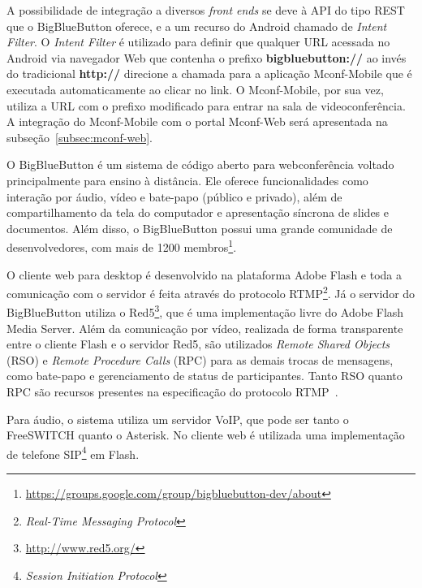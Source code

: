 \documentclass{acm_proc_article-sp}
\begin{document}
A possibilidade de integração a diversos \emph{front ends} se deve à API do tipo REST que o BigBlueButton oferece, e a um recurso do Android chamado de \emph{Intent Filter}. O \emph{Intent Filter} é utilizado para definir que qualquer URL acessada no Android via navegador Web que contenha o prefixo \textbf{bigbluebutton://} ao invés do tradicional \textbf{http://} direcione a chamada para a aplicação Mconf-Mobile que é executada automaticamente ao clicar no link. O Mconf-Mobile, por sua vez, utiliza a URL com o prefixo modificado para entrar na sala de videoconferência. A integração do Mconf-Mobile com o portal Mconf-Web será apresentada na subseção~\ref{subsec:mconf-web}.


O BigBlueButton é um sistema de código aberto para webconferência voltado principalmente para ensino à distância. Ele oferece funcionalidades como interação por áudio, vídeo e bate-papo (público e privado), além de compartilhamento da tela do computador e apresentação síncrona de slides e documentos. Além disso, o BigBlueButton possui uma grande comunidade de desenvolvedores, com mais de 1200 membros\footnote{\url{https://groups.google.com/group/bigbluebutton-dev/about}}.

O cliente web para desktop é desenvolvido na plataforma Adobe Flash e toda a comunicação com o servidor é feita através do protocolo RTMP\footnote{\emph{Real-Time Messaging Protocol}}. Já o servidor do BigBlueButton utiliza o Red5\footnote{\url{http://www.red5.org/}}, que é uma implementação livre do Adobe Flash Media Server. Além da comunicação por vídeo, realizada de forma transparente entre o cliente Flash e o servidor Red5, são utilizados \emph{Remote Shared Objects} (RSO) e \emph{Remote Procedure Calls} (RPC) para as demais trocas de mensagens, como bate-papo e gerenciamento de status de participantes. Tanto RSO quanto RPC são recursos presentes na especificação do protocolo RTMP~\cite{rtmp}.

Para áudio, o sistema utiliza um servidor VoIP, que pode ser tanto o FreeSWITCH quanto o Asterisk. No cliente web é utilizada uma implementação de telefone SIP\footnote{\emph{Session Initiation Protocol}} em Flash.

\end{document}
